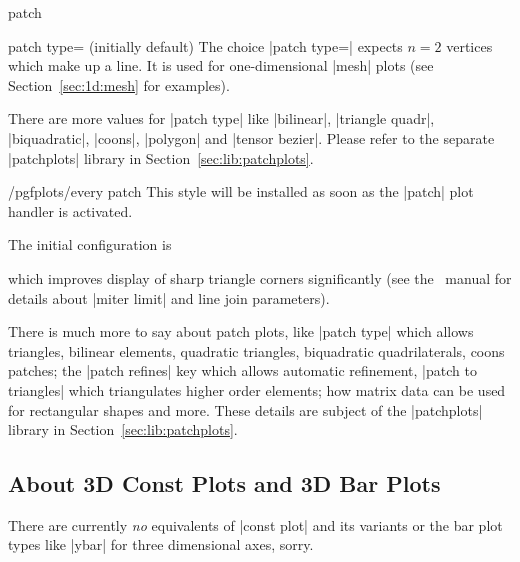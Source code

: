 {\begin{plottype}[/pgfplots]{patch}
\begin{pgfplotskey}{patch type= (initially default)}
	The choice |patch type=| expects $n=2$ vertices which make up a line. It is used for one-dimensional |mesh| plots (see Section~\ref{sec:1d:mesh} for examples).

	There are more values for |patch type| like |bilinear|, |triangle quadr|, |biquadratic|, |coons|, |polygon| and |tensor bezier|. Please refer to the separate |patchplots| library in Section~\ref{sec:lib:patchplots}.
\end{pgfplotskey}

\begin{stylekey}{/pgfplots/every patch}
	This style will be installed as soon as the |patch| plot handler is activated. 

	The initial configuration is
\begin{codeexample}
\end{codeexample}
	\noindent which improves display of sharp triangle corners significantly (see the \Tikz\ manual for details about |miter limit| and line join parameters).
\end{stylekey}

	There is much more to say about patch plots, like |patch type| which allows triangles, bilinear elements, quadratic triangles, biquadratic quadrilaterals, coons patches; the |patch refines| key which allows automatic refinement, |patch to triangles| which triangulates higher order elements;  how matrix data can be used for rectangular shapes and more. These details are subject of the |patchplots| library in Section~\ref{sec:lib:patchplots}.
\end{plottype}

\subsection{About 3D Const Plots and 3D Bar Plots}
There are currently \emph{no} equivalents of |const plot| and its variants or the bar plot types like |ybar| for three dimensional axes, sorry.

}
